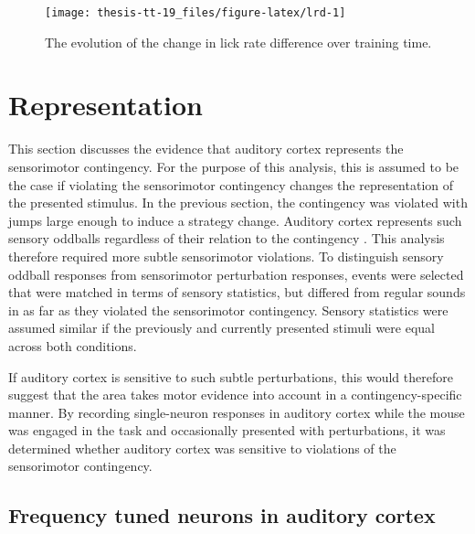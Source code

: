 \documentclass[]{report}
\theoremstyle{definition}
\theoremstyle{definition}
\theoremstyle{definition}
\theoremstyle{remark}
\begin{document}
\begin{figure}

{\centering \texttt{[image: thesis-tt-19\_files/figure-latex/lrd-1]} 

}

\caption{The evolution of the change in lick rate difference over
training time.}\label{fig:lrd}
\end{figure}




\hypertarget{representation}{%
\section{Representation}\label{representation}}

This section discusses the evidence that auditory cortex represents the
sensorimotor contingency. For the purpose of this analysis, this is
assumed to be the case if violating the sensorimotor contingency changes
the representation of the presented stimulus. In the previous section,
the contingency was violated with jumps large enough to induce a
strategy change. Auditory cortex represents such sensory oddballs
regardless of their relation to the contingency
\citep{rubin2016representation}. This analysis therefore required more
subtle sensorimotor violations. To distinguish sensory oddball responses
from sensorimotor perturbation responses, events were selected that were
matched in terms of sensory statistics, but differed from regular sounds
in as far as they violated the sensorimotor contingency. Sensory
statistics were assumed similar if the previously and currently
presented stimuli were equal across both conditions.

If auditory cortex is sensitive to such subtle perturbations, this would
therefore suggest that the area takes motor evidence into account in a
contingency-specific manner. By recording single-neuron responses in
auditory cortex while the mouse was engaged in the task and occasionally
presented with perturbations, it was determined whether auditory cortex
was sensitive to violations of the sensorimotor contingency.

\hypertarget{frequency-tuned-neurons-in-auditory-cortex}{%
\subsection{Frequency tuned neurons in auditory
cortex}\label{frequency-tuned-neurons-in-auditory-cortex}}
\end{document}
